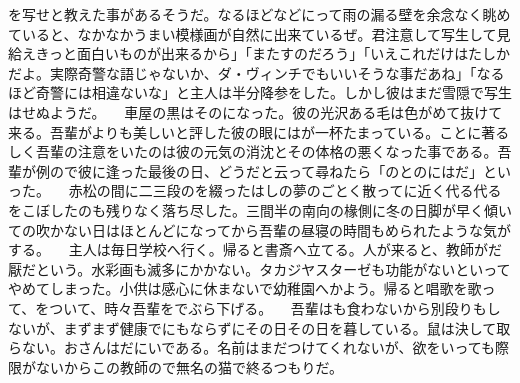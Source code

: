 \documentclass[a5j]{ltjbook}
\begin{document}
を写せと教えた事があるそうだ。なるほどなどにって雨の漏る壁を余念なく眺めていると、なかなかうまい模様画が自然に出来ているぜ。君注意して写生して見給えきっと面白いものが出来るから」「またすのだろう」「いえこれだけはたしかだよ。実際奇警な語じゃないか、ダ・ヴィンチでもいいそうな事だあね」「なるほど奇警には相違ないな」と主人は半分降参をした。しかし彼はまだ雪隠で写生はせぬようだ。 \newline
　車屋の黒はそのになった。彼の光沢ある毛は色がめて抜けて来る。吾輩がよりも美しいと評した彼の眼にはが一杯たまっている。ことに著るしく吾輩の注意をいたのは彼の元気の消沈とその体格の悪くなった事である。吾輩が例ので彼に逢った最後の日、どうだと云って尋ねたら「のとのにはだ」といった。 \newline
　赤松の間に二三段のを綴ったはしの夢のごとく散ってに近く代る代るをこぼしたのも残りなく落ち尽した。三間半の南向の椽側に冬の日脚が早く傾いての吹かない日はほとんどになってから吾輩の昼寝の時間もめられたような気がする。 \newline
　主人は毎日学校へ行く。帰ると書斎へ立てる。人が来ると、教師がだ厭だという。水彩画も滅多にかかない。タカジヤスターゼも功能がないといってやめてしまった。小供は感心に休まないで幼稚園へかよう。帰ると唱歌を歌って、をついて、時々吾輩をでぶら下げる。 \newline
　吾輩はも食わないから別段りもしないが、まずまず健康でにもならずにその日その日を暮している。鼠は決して取らない。おさんはだにいである。名前はまだつけてくれないが、欲をいっても際限がないからこの教師ので無名の猫で終るつもりだ。 \newline
\newline
\end{document}
